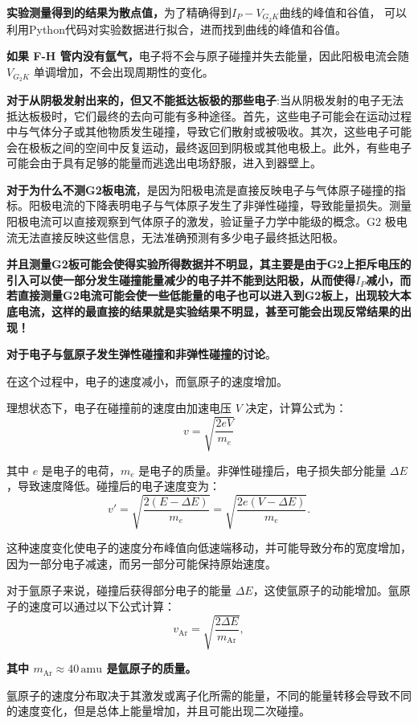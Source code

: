\documentclass[dvipsnames, svgnames,a4paper,11pt]{article}
\begin{document}
\textbf{实验测量得到的结果为散点值，}为了精确得到$I_{P}-V_{G_{2}K}$曲线的峰值和谷值， 可以利用Python代码对实验数据进行拟合，进而找到曲线的峰值和谷值。


\textbf{如果 F-H 管内没有氩气，}电子将不会与原子碰撞并失去能量，因此阳极电流会随 $V_{G_2K}$ 单调增加，不会出现周期性的变化。


\textbf{对于从阴极发射出来的，但又不能抵达板极的那些电子}:当从阴极发射的电子无法抵达板极时，它们最终的去向可能有多种途径。首先，这些电子可能会在运动过程中与气体分子或其他物质发生碰撞，导致它们散射或被吸收。其次，这些电子可能会在极板之间的空间中反复运动，最终返回到阴极或其他电极上。此外，有些电子可能会由于具有足够的能量而逃逸出电场舒服，进入到器壁上。

\textbf{对于为什么不测G2板电流}，是因为阳极电流是直接反映电子与气体原子碰撞的指标。阳极电流的下降表明电子与气体原子发生了非弹性碰撞，导致能量损失。测量阳极电流可以直接观察到气体原子的激发，验证量子力学中能级的概念。G2 极电流无法直接反映这些信息，无法准确预测有多少电子最终抵达阳极。

\textbf{并且测量G2板可能会使得实验所得数据并不明显，其主要是由于G2上拒斥电压的引入可以使一部分发生碰撞能量减少的电子并不能到达阳极，从而使得$I_P$减小，而若直接测量G2电流可能会使一些低能量的电子也可以进入到G2板上，出现较大本底电流，这样的最直接的结果就是实验结果不明显，甚至可能会出现反常结果的出现！}

\textbf{对于电子与氩原子发生弹性碰撞和非弹性碰撞的讨论}。

在这个过程中，电子的速度减小，而氩原子的速度增加。

理想状态下，电子在碰撞前的速度由加速电压 \(V\) 决定，计算公式为：
\[
v = \sqrt{ \frac{2eV}{m_e} }
\]

其中 \(e\) 是电子的电荷，\(m_e\) 是电子的质量。非弹性碰撞后，电子损失部分能量 \(\Delta E\)，导致速度降低。碰撞后的电子速度变为：
\[
v' = \sqrt{ \frac{2(E - \Delta E)}{m_e} } = \sqrt{ \frac{2e(V - \Delta E)}{m_e} }.
\]

这种速度变化使电子的速度分布峰值向低速端移动，并可能导致分布的宽度增加，因为一部分电子减速，而另一部分可能保持原始速度。


对于氩原子来说，碰撞后获得部分电子的能量 \(\Delta E\)，这使氩原子的动能增加。氩原子的速度可以通过以下公式计算：
\[
v_{\text{Ar}} = \sqrt{ \frac{2 \Delta E}{m_{\text{Ar}}} },
\]

\textbf{其中 \(m_{\text{Ar}} \approx 40 \, \text{amu}\) 是氩原子的质量。}

氩原子的速度分布取决于其激发或离子化所需的能量，不同的能量转移会导致不同的速度变化，但是总体上能量增加，并且可能出现二次碰撞。
\end{document}
